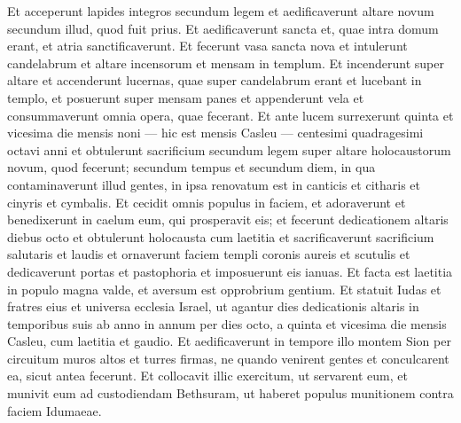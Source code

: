 \begin{biblechapter}
\begin{biblechapter}
\begin{biblechapter}
\begin{biblechapter}
\verse Et acceperunt lapides integros secundum legem et aedificaverunt altare novum secundum illud, quod fuit prius. 
\verse Et aedificaverunt sancta et, quae intra domum erant, et atria sanctificaverunt. 
 \verse Et fecerunt vasa sancta nova et intulerunt candelabrum et altare incensorum et mensam in templum. 
\verse Et incenderunt super altare et accenderunt lucernas, quae super candelabrum erant et lucebant in templo, 
\verse et posuerunt super mensam panes et appenderunt vela et consummaverunt omnia opera, quae fecerant. 
\verse Et ante lucem surrexerunt quinta et vicesima die mensis noni — hic est mensis Casleu — centesimi quadragesimi octavi anni 
\verse et obtulerunt sacrificium secundum legem super altare holocaustorum novum, quod fecerunt; 
\verse secundum tempus et secundum diem, in qua contaminaverunt illud gentes, in ipsa renovatum est in canticis et citharis et cinyris et cymbalis. 
 \verse Et cecidit omnis populus in faciem, et adoraverunt et benedixerunt in caelum eum, qui prosperavit eis; 
\verse et fecerunt dedicationem altaris diebus octo et obtulerunt holocausta cum laetitia et sacrificaverunt sacrificium salutaris et laudis 
\verse et ornaverunt faciem templi coronis aureis et scutulis et dedicaverunt portas et pastophoria et imposuerunt eis ianuas. 
\verse Et facta est laetitia in populo magna valde, et aversum est opprobrium gentium.
 \verse Et statuit Iudas et fratres eius et universa ecclesia Israel, ut agantur dies dedicationis altaris in temporibus suis ab anno in annum per dies octo, a quinta et vicesima die mensis Casleu, cum laetitia et gaudio. 
\verse Et aedificaverunt in tempore illo montem Sion per circuitum muros altos et turres firmas, ne quando venirent gentes et conculcarent ea, sicut antea fecerunt. 
\verse Et collocavit illic exercitum, ut servarent eum, et munivit eum ad custodiendam Bethsuram, ut haberet populus munitionem contra faciem Idumaeae.
 

\end{biblechapter}
\end{biblechapter}
\end{biblechapter}
\end{biblechapter}
